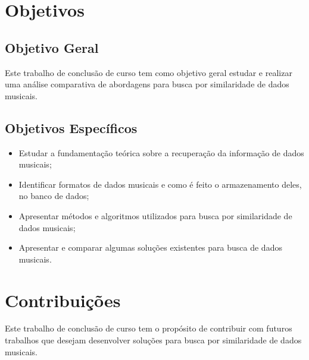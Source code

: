 \section{Objetivos}
\subsection{Objetivo Geral}
Este trabalho de conclusão de curso tem como objetivo geral estudar e realizar uma análise comparativa de abordagens para busca por similaridade de dados musicais.

\subsection{Objetivos Específicos}
 \begin{itemize}
   \item Estudar a fundamentação teórica sobre a recuperação da informação de dados musicais;
   \item Identificar formatos de dados musicais e como é feito o armazenamento deles, no banco de dados;
   \item Apresentar métodos e algoritmos utilizados para busca por similaridade de dados musicais;
   \item Apresentar e comparar algumas soluções existentes para busca de dados musicais.
 \end{itemize}

\section{Contribuições}
Este trabalho de conclusão de curso tem o propósito de contribuir com futuros trabalhos que desejam desenvolver soluções para busca por similaridade de dados musicais.